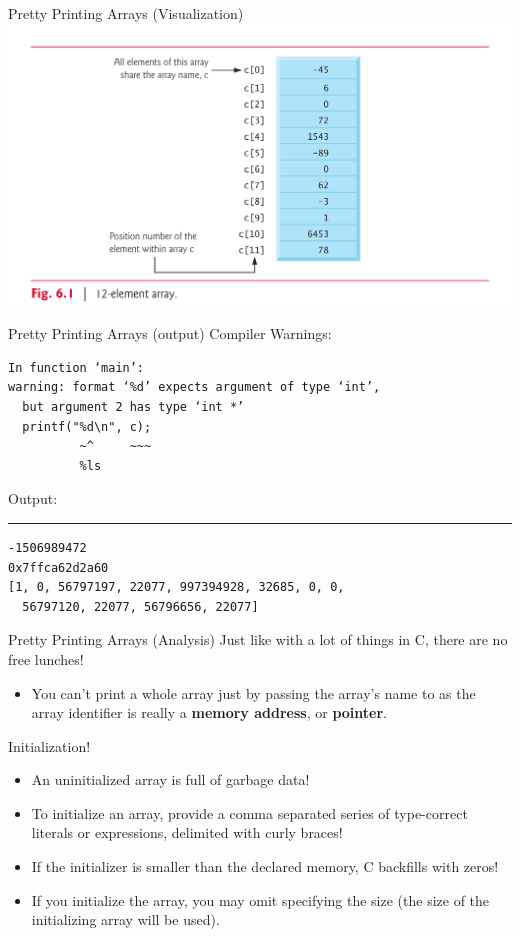 \documentclass[11pt]{beamer}
\let\OldTexttt\texttt
\renewcommand{\texttt}[1]{\OldTexttt{\color{teal}{#1}}}
\begin{document}
\begin{frame}{Pretty Printing Arrays (Visualization)}
\center
\includegraphics[scale=0.1]{array.png}
\end{frame}

\begin{frame}[fragile=singleslide]{Pretty Printing Arrays (output)}
Compiler Warnings:
\begin{verbatim}
In function ‘main’:
warning: format ‘%d’ expects argument of type ‘int’, 
  but argument 2 has type ‘int *’
  printf("%d\n", c);
          ~^     ~~~
          %ls
\end{verbatim}
Output:
\hrule
\begin{verbatim}
-1506989472
0x7ffca62d2a60
[1, 0, 56797197, 22077, 997394928, 32685, 0, 0, 
  56797120, 22077, 56796656, 22077]
\end{verbatim}
\end{frame}

\begin{frame}{Pretty Printing Arrays (Analysis)}
Just like with a lot of things in C, there are no free lunches! 
\begin{itemize}
\item You can't print a whole array just by passing the array's name to \texttt{printf} as the array identifier is really a \textbf{memory address}, or \textbf{pointer}.
\end{itemize}
Initialization!
\begin{itemize}
\item An uninitialized array is full of garbage data! 
\item To initialize an array, provide a comma separated series of type-correct literals or expressions, delimited with curly braces! 
\item If the initializer is smaller than the declared memory, C backfills with zeros!
\item If you initialize the array, you may omit specifying the size (the size of the initializing array will be used).
\end{itemize}
\end{frame}
\end{document}
